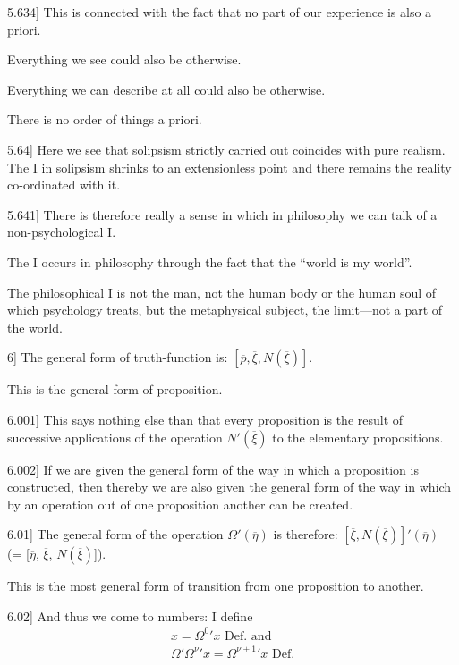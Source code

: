 \documentclass[12pt,oneside]{book}[2007/10/19]
\newcommand{\PropositionE}[2]{%
  \item[\phantomsection\label{PropE:#1}\PropGRef{#1}] #2%
}
\newcommand{\PropGRef}[1]{\hyperref[PropG:#1]{#1}}
\begin{document}
\begin{propositions}
\PropositionE{5.634}
{This is connected with the fact that no part of
our experience is also a priori.

Everything we see could also be otherwise.

Everything we can describe at all could also be
otherwise.

There is no order of things a priori.}


\PropositionE{5.64}
{Here we see that solipsism strictly carried out
coincides with pure realism. The I in solipsism
shrinks to an extensionless point and there remains
the reality co-ordinated with it.}


\PropositionE{5.641}
{There is therefore really a sense in which in
philosophy we can talk of a non-psy\-cho\-log\-i\-cal I.

The I occurs in philosophy through the fact
that the ``world is my world''.

The philosophical I is not the man, not the
human body or the human soul of which psychology
treats, but the metaphysical subject, the
limit---not a part of the world.}


\PropositionE{6}
{The general form of truth-function is:
$[\overline{p}, \overline{\xi}, N(\overline{\xi})]$.

This is the general form of proposition.}


\PropositionE{6.001}
{This says nothing else than that every proposition
is the result of successive applications
of the operation $N'(\overline{\xi})$ to the elementary propositions.}


\PropositionE{6.002}
{If we are given the general form of the way in
which a proposition is constructed, then thereby
we are also given the general form of the way in
which by an operation out of one proposition
another can be created.}


\PropositionE{6.01}
{The general form of the operation $\Omega'(\overline{\eta})$ is
therefore: $[\overline{\xi}, N(\overline{\xi})]'${}$(\overline{\eta})$ (= [$\overline{\eta}$, $\overline{\xi}$, $N(\overline{\xi})$]).

This is the most general form of transition from
one proposition to another.}


\PropositionE{6.02}
{And thus we come to numbers: I define
\begin{gather*}
x = \Omega^{0}{}' x \text{ Def.\ and}\\
\Omega'\Omega^{\nu}{}'x = \Omega^{\nu+1}{}'x \text{ Def.}
\end{gather*}

}
\end{propositions}
\end{document}
